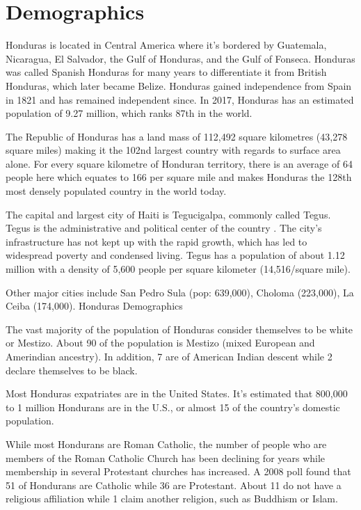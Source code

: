 \chapter{Demographics}

Honduras is located in Central America where it's bordered by Guatemala, Nicaragua, El Salvador, the Gulf of Honduras, and the Gulf of Fonseca. Honduras was called Spanish Honduras for many years to differentiate it from British Honduras, which later became Belize. Honduras gained independence from Spain in 1821 and has remained independent since. In 2017, Honduras has an estimated population of 9.27 million, which ranks 87th in the world.

The Republic of Honduras has a land mass of 112,492 square kilometres (43,278 square miles) making it the 102nd largest country with regards to surface area alone. For every square kilometre of Honduran territory, there is an average of 64 people here which equates to 166 per square mile and makes Honduras the 128th most densely populated country in the world today.

The capital and largest city of Haiti is Tegucigalpa, commonly called Tegus. Tegus is the administrative and political center of the country . The city's infrastructure has not kept up with the rapid growth, which has led to widespread poverty and condensed living. Tegus has a population of about 1.12 million with a density of 5,600 people per square kilometer (14,516/square mile).

Other major cities include San Pedro Sula (pop: 639,000), Choloma (223,000), La Ceiba (174,000).
Honduras Demographics

The vast majority of the population of Honduras consider themselves to be white or Mestizo. About 90 of the population is Mestizo (mixed European and Amerindian ancestry). In addition, 7 are of American Indian descent while 2 declare themselves to be black.

Most Honduras expatriates are in the United States. It's estimated that 800,000 to 1 million Hondurans are in the U.S., or almost 15 of the country's domestic population.

While most Hondurans are Roman Catholic, the number of people who are members of the Roman Catholic Church has been declining for years while membership in several Protestant churches has increased. A 2008 poll found that 51 of Hondurans are Catholic while 36 are Protestant. About 11 do not have a religious affiliation while 1 claim another religion, such as Buddhism or Islam.
